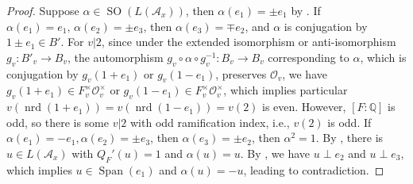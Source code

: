 \documentclass{amsart}
\numberwithin{equation}{subsection}
\numberwithin{theorem}{section}
\theoremstyle{definition}
\theoremstyle{remark}
\newcommand{\bQ}{\mathbb{Q}}
\newcommand{\cA}{\mathcal{A}}
\newcommand{\cO}{\mathcal{O}}
\DeclareMathOperator{\SO}{SO}
\DeclareMathOperator{\nrd}{nrd}
\DeclareMathOperator{\Span}{Span}
\begin{document}
\begin{proof}
    Suppose $\alpha\in \SO(L(\cA_x))$, then $\alpha(e_1) = \pm e_1$ by . If $\alpha(e_1) = e_1, \, \alpha(e_2) = \pm e_3$, then $\alpha(e_3) =  \mp e_2$, and $\alpha$ is conjugation by $1\pm e_1 \in B'$. For $v|2$, since under the extended isomorphism or anti-isomorphism $g_v: B'_v \to B_v$, the automorphism $g_v \circ \alpha \circ g_v^{-1}: B_v\to B_v$ corresponding to $\alpha$, which is conjugation by $g_v(1 +  e_1)$ or $g_v(1- e_1)$, preserves $\cO_v$, we have $g_v(1+e_1) \in F_v^\times\cO_v^\times$ or  $g_v(1-e_1) \in F_v^\times\cO_v^\times$, which implies particular $v(\nrd(1+e_1)) = v(\nrd(1-e_1)) = v(2)$ is even. However, $[F:\bQ]$ is odd, so there is some $v|2$ with odd ramification index, i.e., $v(2)$ is odd. 
    If $\alpha(e_1) = -e_1, \alpha(e_2) = \pm e_3$, then $\alpha(e_3) = \pm e_2$, then $\alpha^2 = 1$. By , there is $u\in L(\cA_x)$ with $Q_F'(u) = 1$ and $\alpha(u) = u$. By , we have $u\perp e_2$ and $u\perp e_3$, which implies $u\in \Span(e_1)$ and $\alpha(u) = -u$, leading to contradiction. 
\end{proof}
\end{document}
